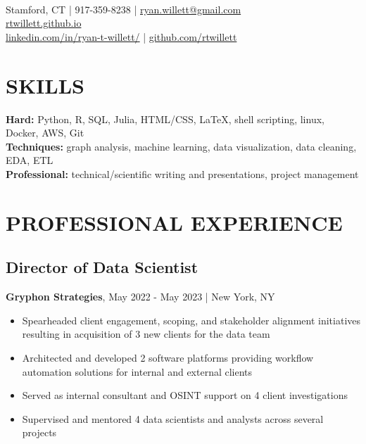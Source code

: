 \documentclass[11pt]{article}
\title{\vspace{-7cm}}
\date{}
\author{Ryan Willett}
\newenvironment{myitemize}
{ \begin{itemize}
	\setlength{\itemsep}{0pt}
	\setlength{\parskip}{0pt}
	\setlength{\parsep}{0pt}     }
{ \end{itemize}                  }
\begin{document}
\maketitle

\section*{}
  \\
\normalsize
Stamford, CT | 917-359-8238 | \href{mailto:ryan.willett@gmail.com}{ryan.willett@gmail.com} \\
\href{http://rtwillett.github.io}{rtwillett.github.io} \\
\href{https://linkedin.com/in/ryan-t-willett/}{linkedin.com/in/ryan-t-willett/} | \href{https://github.com/rtwillett}{github.com/rtwillett}

\raggedright

\section*{SKILLS}
{\bfseries Hard:} Python, R, SQL, Julia, HTML/CSS, \LaTeX, shell scripting, linux, Docker, AWS, Git \\
{\bfseries Techniques:} graph analysis, machine learning, data visualization, data cleaning, EDA, ETL \\
{\bfseries Professional:} technical/scientific writing and presentations, project management

\section*{PROFESSIONAL EXPERIENCE}

\subsection*{Director of Data Scientist}
{\bfseries Gryphon Strategies}, May 2022 - May 2023 | New York, NY
\begin{myitemize}
	\item Spearheaded client engagement, scoping, and stakeholder alignment initiatives resulting in acquisition of 3 new clients for the data team
	\item Architected and developed 2 software platforms providing workflow automation solutions for internal and external clients
	\item Served as internal consultant and OSINT support on 4 client investigations
	\item Supervised and mentored 4 data scientists and analysts across several projects
\end{myitemize}
\end{document}
